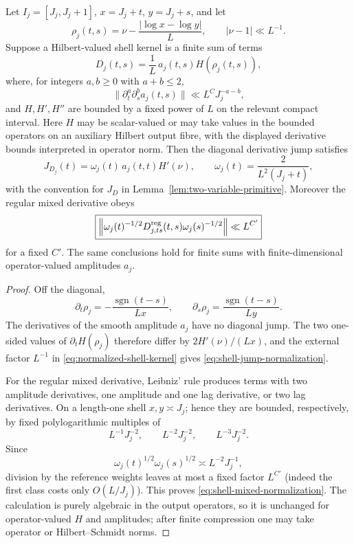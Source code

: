 \begin{lemma}
\label{lem:shell-normalization-transfer}
Let $I_j=[J_j,J_j+1]$, $x=J_j+t$, $y=J_j+s$, and let
\[
\rho_j(t,s)=\nu-\frac{|\log x-\log y|}{L},
\qquad |\nu-1|\ll L^{-1}.
\]
Suppose a Hilbert-valued shell kernel is a finite sum of terms
\begin{equation}
D_j(t,s)=\frac1L\,a_j(t,s)H(\rho_j(t,s)),
\label{eq:normalized-shell-kernel}
\end{equation}
where, for integers $a,b\ge0$ with $a+b\le2$,
\[
\|\partial_t^a\partial_s^b a_j(t,s)\|
\ll L^C J_j^{-a-b},
\]
and $H,H',H''$ are bounded by a fixed power of $L$ on the relevant compact
interval.  Here $H$ may be scalar-valued or may take values in the bounded
operators on an auxiliary Hilbert output fibre, with the displayed derivative
bounds interpreted in operator norm. Then the diagonal derivative jump satisfies
\begin{equation}
\boxed{
J_{D_j}(t)=\omega_j(t)\,a_j(t,t)H'(\nu),
\qquad
\omega_j(t)=\frac{2}{L^2(J_j+t)},
}
\label{eq:shell-jump-normalization}
\end{equation}
with the convention for $J_D$ in Lemma~\ref{lem:two-variable-primitive}.
Moreover the regular
mixed derivative obeys
\begin{equation}
\boxed{
\left\|\omega_j(t)^{-1/2}
D_{j,ts}^{\rm reg}(t,s)
\omega_j(s)^{-1/2}\right\|
\ll L^{C'}
}
\label{eq:shell-mixed-normalization}
\end{equation}
for a fixed $C'$. The same conclusions hold for finite sums with finite-dimensional
operator-valued amplitudes $a_j$.
\end{lemma}

\begin{proof}
Off the diagonal,
\[
\partial_t\rho_j
=-\frac{\operatorname{sgn}(t-s)}{Lx},
\qquad
\partial_s\rho_j
=\frac{\operatorname{sgn}(t-s)}{Ly}.
\]
The derivatives of the smooth amplitude $a_j$ have no diagonal jump. The two
one-sided values of $\partial_tH(\rho_j)$ therefore differ by
$2H'(\nu)/(Lx)$, and the external factor $L^{-1}$ in
\eqref{eq:normalized-shell-kernel} gives
\eqref{eq:shell-jump-normalization}.

For the regular mixed derivative, Leibniz' rule produces terms with two
amplitude derivatives, one amplitude and one lag derivative, or two lag
derivatives. On a length-one shell $x,y\asymp J_j$; hence they are bounded,
respectively, by fixed polylogarithmic multiples of
\[
L^{-1}J_j^{-2},
\qquad L^{-2}J_j^{-2},
\qquad L^{-3}J_j^{-2}.
\]
Since
\[
\omega_j(t)^{1/2}\omega_j(s)^{1/2}\asymp L^{-2}J_j^{-1},
\]
division by the reference weights leaves at most a fixed factor
$L^{C'}$ (indeed the first class costs only $O(L/J_j)$). This proves
\eqref{eq:shell-mixed-normalization}. The calculation is purely algebraic in the
output operators, so it is unchanged for operator-valued $H$ and amplitudes;
after finite compression one may take operator or Hilbert--Schmidt norms.
\end{proof}

